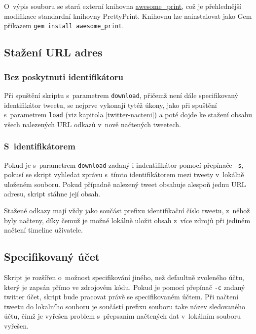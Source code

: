 \documentclass[11pt,a4paper]{article}
\begin{document}
      O~výpis souboru se stará externí knihovna
      \href{https://github.com/michaeldv/awesome_print}{awesome\_print}, což je
      přehlednější modifikace standardní knihovny PrettyPrint. Knihovnu
      lze nainstalovat jako Gem příkazem \texttt{gem install awesome\_print}.

    \subsection{Stažení URL adres}

      \subsubsection{Bez poskytnuti identifikátoru}

        Při spuštění skriptu s~parametrem \texttt{download}, přičemž není dále
        specifikovaný identifikátor tweetu, se nejprve vykonají tytéž úkony,
        jako při spuštění s~parametrem \texttt{load} (viz kapitola
        \ref{twitter-nacteni}) a poté dojde ke stažení obsahu všech nalezených
        URL odkazů v~nově načtených tweetech.

      \subsubsection{S~identifikátorem}

        Pokud je s~parametrem \texttt{download} zadaný i indentifikátor pomocí
        přepínače \texttt{-s}, pokusí se skript vyhledat zprávu s~tímto
        identifikátorem mezi tweety v~lokálně uloženém souboru. Pokud případně
        nalezený tweet obsahuje alespoň jednu URL adresu, skript stáhne její
        obsah.

      Stažené odkazy mají vždy jako součást prefixu identifikační číslo tweetu,
      z~něhož byly načteny, díky čemuž je možné lokálně uložit obsah z~více
      zdrojů při jediném načtení timeline uživatele.

    \subsection{Specifikovaný účet}

      Skript je rozšířen o~možnost specifikování jiného, než defaultně
      zvoleného účtu, který je zapsán přímo ve zdrojovém kódu.
      Pokud je pomocí přepínač \texttt{-c} zadaný twitter účet, skript bude
      pracovat právě se specifikovaném účtem. Při načtení tweetu do lokalního
      souboru je součástí prefixu souboru take název sledovaného účtu, čímž je
      vyřešen problem s~přepsaním načtených dat v~lokálním souboru vyřešen.
\end{document}
